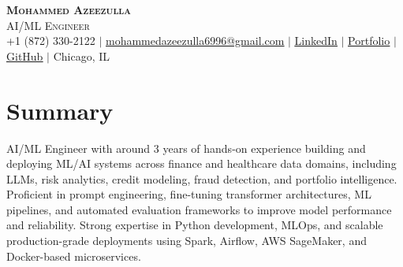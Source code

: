 \documentclass[letterpaper,11pt]{article}
\begin{document}
\begin{center}
    \textbf{\LARGE \scshape Mohammed Azeezulla} \\ \vspace{1pt}
    \small\textsc{AI/ML Engineer} \\ \vspace{1pt}
    \small +1 (872) 330-2122 $|$ 
    \href{mailto:mohammedazeezulla6996@gmail.com}{\underline{mohammedazeezulla6996@gmail.com}} $|$ 
    \href{LINKEDIN_URL}{\underline{LinkedIn}} $|$ 
    \href{PORTFOLIO_URL}{\underline{Portfolio}} $|$ 
    \href{GITHUB_URL}{\underline{GitHub}} $|$ 
    Chicago, IL
\end{center}

\section{Summary}
\vspace{-4pt}
\small{
AI/ML Engineer with around 3 years of hands-on experience building and deploying ML/AI systems across finance and healthcare data domains, including LLMs, risk analytics, credit modeling, fraud detection, and portfolio intelligence. Proficient in prompt engineering, fine-tuning transformer architectures, ML pipelines, and automated evaluation frameworks to improve model performance and reliability. Strong expertise in Python development, MLOps, and scalable production-grade deployments using Spark, Airflow, AWS SageMaker, and Docker-based microservices.
}
\vspace{2pt}
\end{document}

